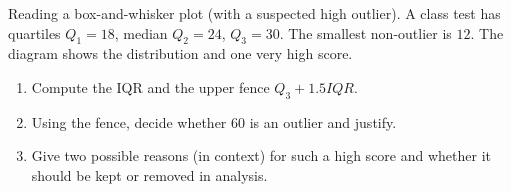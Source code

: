 \documentclass[11pt]{article}
\def\textbf#1{#1}%
\def\mathrm#1{#1}%
\newcounter{question}
\begin{document}

\begin{question}
\textbf{Reading a box-and-whisker plot (with a suspected high outlier).}
A class test has quartiles $Q_1=18$, median $Q_2=24$, $Q_3=30$. The smallest non-outlier is $12$.  
The diagram shows the distribution and one very high score.

\begin{center}
\end{center}

\begin{enumerate}
  \item Compute the IQR and the upper fence $Q_3+1.5\mathrm{IQR}$.
  \item Using the fence, decide whether $60$ is an outlier and justify.
  \item Give two possible reasons (in context) for such a high score and whether it should be kept or removed in analysis.
\end{enumerate}
\end{question}

\end{document}

